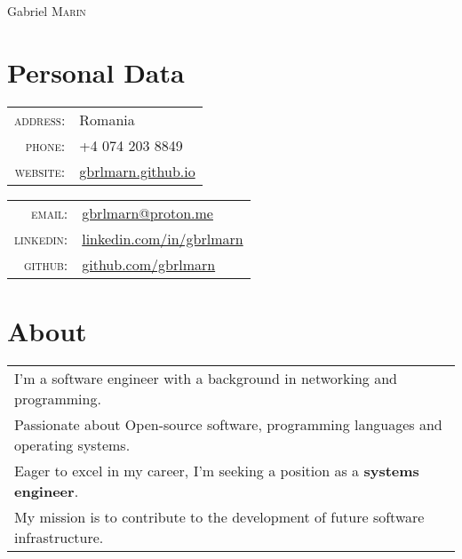 \documentclass[a4paper,12pt]{article}
\begin{document}
\pagestyle{empty}

\par
  {\centering
    {\Huge Gabriel \textsc{Marin}}
    \bigskip\par
  }

\section{Personal Data}
\begin{multicols}{2}
  \begin{tabular}{rl}
    \textsc{address:}&Romania\\
    \textsc{phone:}&+4 074 203 8849\\
    \textsc{website:}&\href{https://gbrlmarn.github.io}
      {gbrlmarn.github.io}\\
  \end{tabular}
    \columnbreak
  \begin{tabular}{rl}
    \textsc{email:}&\href{mailto:gbrlmarn@proton.me}
      {gbrlmarn@proton.me}\\
    \textsc{linkedin:}&\href{https://linkedin.com/in/gbrlmarn}
      {linkedin.com/in/gbrlmarn}\\
    \textsc{github:}&\href{https://github.com/gbrlmarn}
      {github.com/gbrlmarn}\\
  \end{tabular}
\end{multicols}

\section{About}
\begin{tabular}{l}
I'm a software engineer with a background in 
networking and programming.\\
Passionate about Open-source software, 
programming languages and operating systems.\\
Eager to excel in my career, 
I'm seeking a position as a \textbf{systems engineer}.\\ 
My mission is to contribute to the development 
of future software infrastructure.\\
\end{tabular}

\end{document}
